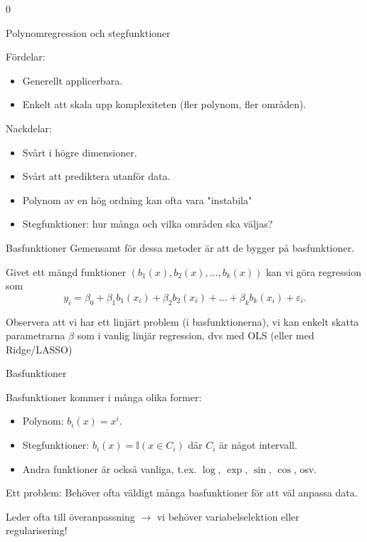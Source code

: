 0\documentclass[10pt,english]{beamer}
\begin{document}
\begin{frame}{Polynomregression och stegfunktioner}
    
    Fördelar:
    \begin{itemize}
        \item Generellt applicerbara.
        \item Enkelt att skala upp komplexiteten (fler polynom, fler områden).
    \end{itemize}

    Nackdelar:
    \begin{itemize}
        \item Svårt i högre dimensioner.
        \item Svårt att prediktera utanför data.
        \item Polynom av en hög ordning kan ofta vara "instabila"
        \item Stegfunktioner: hur många och vilka områden ska väljas?
    \end{itemize}
\end{frame}

\begin{frame}{Basfunktioner}
    Gemensamt för dessa metoder är att de bygger på basfunktioner.

    Givet ett mängd funktioner $(b_1(x), b_2(x), \ldots, b_k(x))$ kan vi göra regression som
    \begin{equation*}
        y_i = \beta_0 + \beta_1 b_1(x_i) + \beta_2 b_2(x_i) + \ldots + \beta_k b_k(x_i) + \varepsilon_i.
    \end{equation*}

    Observera att vi har ett linjärt problem (i basfunktionerna), 
    vi kan enkelt skatta parametrarna $\beta$ som i vanlig linjär regression, dvs med OLS (eller med Ridge/LASSO)

\end{frame}

\begin{frame}{Basfunktioner}

    Basfunktioner kommer i många olika former:
    \begin{itemize}
        \item Polynom: $b_i(x) = x^i$.
        \item Stegfunktioner: $b_i(x) = \mathbb{I}(x \in C_i)$ där $C_i$ är något intervall.
        \item Andra funktioner är också vanliga, t.ex. $\log$, $\exp$, $\sin$, $\cos$, osv.
    \end{itemize}
    
    Ett problem: Behöver ofta väldigt många basfunktioner för att väl anpassa data. 
    
    Leder ofta till överanpassning $\rightarrow$ vi behöver variabelselektion eller regularisering!

\end{frame}
\end{document}
